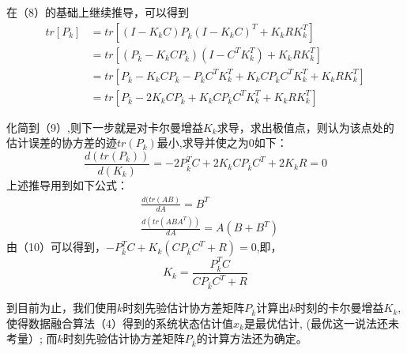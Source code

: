 \documentclass[UTF8,a4paper,10pt]{ctexart}
\begin{document}
    在（8）的基础上继续推导，可以得到
    \begin{equation}
        \begin{aligned}
            tr[P_k] & = tr[(I-K_kC)P_{\bar{k}}(I-K_kC)^T + K_kRK^T_k]\\
                  & = tr [(P_{\bar{k}} -K_kCP_{\bar{k}})(I-C^TK^T_k) + K_kRK^T_k]\\
                  & = tr [P_{\bar{k}} -K_kCP_{\bar{k}} - P_{\bar{k}}C^TK^T_k + K_kCP_{\bar{k}}C^TK^T_k+K_kRK^T_k ]\\
                  & = tr [P_{\bar{k}} -2K_kCP_{\bar{k}} + K_kCP_{\bar{k}}C^TK^T_k+K_kRK^T_k ]
        \end{aligned}
    \end{equation}

    化简到（9）,则下一步就是对卡尔曼增益$K_k$求导，求出极值点，则认为该点处的估计误差的协方差的迹$tr(P_k)$最小,求导并使之为0如下：
    \begin{equation}
            \frac{d(tr(P_k))}{d(K_k)} = -2P^T_{\bar{k}}C + 2K_kCP_{\bar{k}}C^T+ 2K_kR=0
    \end{equation}
    上述推导用到如下公式：
    \begin{equation}\nonumber
        \begin{aligned}
            &\frac{d(tr(AB)}{dA} = B^T\\
            &\frac{d(tr(ABA^T))}{dA} = A(B+B^T)
        \end{aligned}
    \end{equation}
    由（10）可以得到，$-P^T_{\bar{k}}C + K_k(CP_{\bar{k}}C^T+ R)=0$,即，
    \begin{equation}
        K_k = \frac{P^T_{\bar{k}}C}{CP_{\bar{k}}C^T+ R}
    \end{equation}

    到目前为止，我们使用$k$时刻先验估计协方差矩阵$P_{\bar{k}}$计算出$k$时刻的卡尔曼增益$K_k$,使得数据融合算法（4）得到的系统状态估计值$\hat{x}_k$是最优估计,
    (最优这一说法还未考量）;
    而$k$时刻先验估计协方差矩阵$P_{\bar{k}}$的计算方法还为确定。
\end{document}
